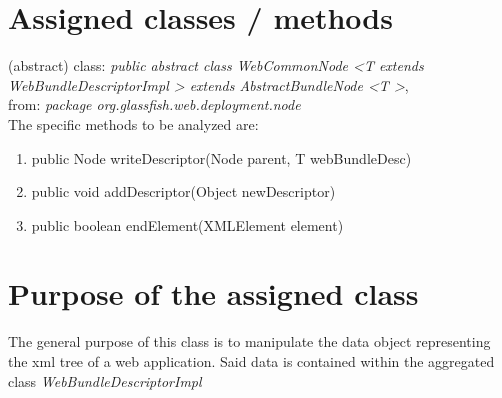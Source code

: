 \section{Assigned classes / methods} 
(abstract) class: \textit{public abstract class WebCommonNode \textless T extends WebBundleDescriptorImpl \textgreater 
extends AbstractBundleNode \textless T \textgreater}, \\
from: \textit{package org.glassfish.web.deployment.node} \\

\vspace{2mm}
The specific methods to be analyzed are:
\begin{enumerate}
 \item public Node writeDescriptor(Node parent, T webBundleDesc)
 \item public void addDescriptor(Object  newDescriptor)
 \item public boolean endElement(XMLElement element)
\end{enumerate}

\section{Purpose of the assigned class}
The general purpose of this class is to manipulate the data object representing the xml tree of a web application.
Said data is contained within the aggregated class \textit{WebBundleDescriptorImpl}
